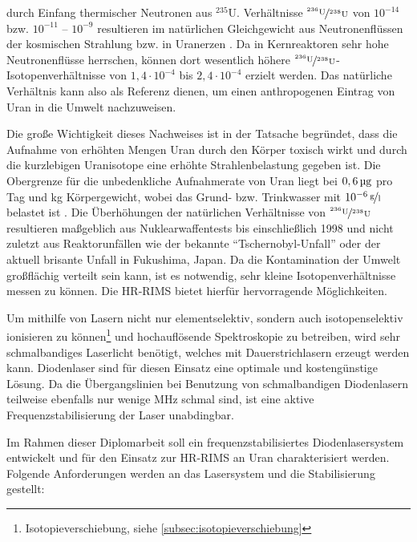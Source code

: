 durch Einfang thermischer Neutronen aus $^{235}$U.
Verhältnisse $\nicefrac{^{236}\text{U}}{^{238}\text{U}}$ von $10^{-14}$ bzw.
$10^{-11}$ -- $10^{-9}$ resultieren im natürlichen Gleichgewicht aus
Neutronenflüssen der kosmischen Strahlung bzw. in Uranerzen \cite{Richter19999}.
Da in Kernreaktoren sehr hohe Neutronenflüsse herrschen, können dort
wesentlich höhere
$\nicefrac{^{236}\text{U}}{^{238}\text{U}}$-Isotopenverhältnisse von
$1,4\cdot10^{-4}$ bis $2,4\cdot10^{-4}$ erzielt werden. Das natürliche Verhältnis kann also als Referenz dienen, um einen anthropogenen Eintrag von Uran in die Umwelt
nachzuweisen.\par
Die große Wichtigkeit dieses Nachweises ist in der Tatsache
begründet, dass die Aufnahme von erhöhten Mengen Uran durch den Körper toxisch
wirkt und durch die kurzlebigen Uranisotope eine erhöhte Strahlenbelastung
gegeben ist. Die Obergrenze für die unbedenkliche Aufnahmerate von Uran liegt
bei $0,6\,\text{\textmu g}$ pro Tag und kg Körpergewicht, wobei das Grund- bzw.
Trinkwasser mit $10^{-6}\,\nicefrac{\text{g}}{\text{l}}$ belastet ist
\cite{who:2005}. Die Überhöhungen der natürlichen Verhältnisse von 
$\nicefrac{^{236}\text{U}}{^{238}\text{U}}$ resultieren maßgeblich aus
Nuklearwaffentests bis einschließlich 1998 und nicht zuletzt aus Reaktorunfällen
wie der bekannte "`Tschernobyl-Unfall"' oder der aktuell brisante Unfall in
Fukushima, Japan. Da die Kontamination der Umwelt großflächig verteilt sein
kann, ist es notwendig, sehr kleine Isotopenverhältnisse messen zu können. Die
HR-RIMS bietet hierfür hervorragende Möglichkeiten.\par
Um mithilfe von Lasern nicht nur elementselektiv, sondern auch
isotopenselektiv ionisieren zu können\footnote{Isotopieverschiebung, siehe
\ref{subsec:isotopieverschiebung}} und hochauflösende Spektroskopie zu
betreiben, wird sehr schmalbandiges Laserlicht benötigt, welches mit
Dauerstrichlasern erzeugt werden kann. Diodenlaser sind für diesen Einsatz eine
optimale und kostengünstige Lösung. Da die Übergangslinien bei Benutzung von
schmalbandigen Diodenlasern teilweise ebenfalls nur wenige MHz schmal sind, ist
eine aktive Frequenzstabilisierung der Laser unabdingbar.\par
Im Rahmen dieser Diplomarbeit soll ein frequenzstabilisiertes Diodenlasersystem
entwickelt und für den Einsatz zur HR-RIMS an Uran charakterisiert werden.
Folgende Anforderungen werden an das Lasersystem und die Stabilisierung gestellt:
